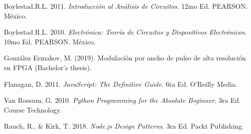 \documentclass[osajnl,twocolumn,showpacs,superscriptaddress,10pt]{revtex4-1}
\begin{document}
\begin{thebibliography}{99}
\bibitem{} Boylestad.R.L. 2011. \textit{Introducción al Análisis de Circuitos}. 12mo Ed. PEARSON. México.

\bibitem{} Boylestad.R.L. 2010. \textit{Electrónica: Teoría de Circuitos y Dispositivos Electrónicos}. 10mo Ed. PEARSON. México.

\bibitem{} González Ermakov, M. (2019). Modulación por ancho de pulso de alta resolución en FPGA (Bachelor's thesis). 

\bibitem{} Flanagan, D. 2011. \textit{JavaScript: The Definitive Guide}. 6ta Ed. O'Reilly Media. 

\bibitem{} Van Rossum, G. 2010. \textit{Python Programming for the Absolute Beginner}. 3ra Ed. Course Technology.

\bibitem{} Rauch, R., \& Kirk, T. 2018. \textit{Node.js Design Patterns}. 3ra Ed. Packt Publishing.

\end{thebibliography}
\end{document}
